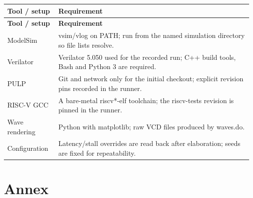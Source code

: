 \documentclass[11pt]{article}
\begin{document}
{\small
\begin{longtable}{@{}L{0.2600\dimexpr\linewidth-12pt\relax}L{0.7400\dimexpr\linewidth-12pt\relax}@{}}
\toprule
\textbf{Tool / setup} & \textbf{Requirement} \\ \midrule
\endfirsthead
\toprule
\textbf{Tool / setup} & \textbf{Requirement} \\ \midrule
\endhead
ModelSim & vsim/vlog on PATH; run from the named simulation directory so file lists resolve. \\ \addlinespace[3pt]
Verilator & Verilator 5.050 used for the recorded run; C++ build tools, Bash and Python 3 are required. \\ \addlinespace[3pt]
PULP & Git and network only for the initial checkout; explicit revision pins recorded in the runner. \\ \addlinespace[3pt]
RISC-V GCC & A bare-metal riscv*-elf toolchain; the riscv-tests revision is pinned in the runner. \\ \addlinespace[3pt]
Wave rendering & Python with matplotlib; raw VCD files produced by waves.do. \\ \addlinespace[3pt]
Configuration & Latency/stall overrides are read back after elaboration; seeds are fixed for repeatability. \\*
\bottomrule\end{longtable}}

\clearpage
\section{Annex}
\end{document}
